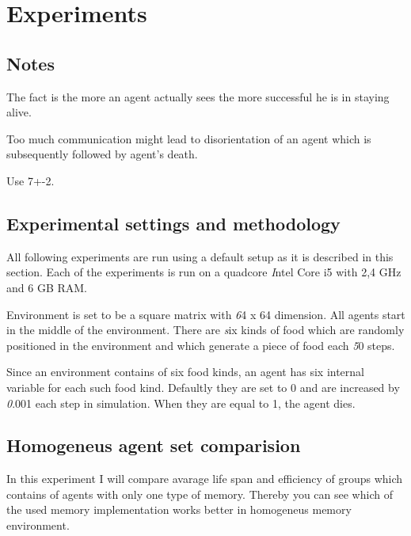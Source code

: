 \chapter{Experiments}

\section{Notes}

The fact is the more an agent actually sees the more successful he is in staying alive.

Too much communication might lead to disorientation of an agent which is subsequently followed by agent's death.

Use 7+-2.

\section{Experimental settings and methodology}

All following experiments are run using a default setup as it is described in this section. Each of the experiments is run on a quadcore {\emph Intel Core i5 with 2,4 GHz and 6 GB RAM}. 

Environment is set to be a square matrix with {\emph 64 x 64 dimension}. All agents start in the middle of the environment. There are {\emph six kinds of food} which are randomly positioned in the environment and which generate a piece of food each {\emph 50 steps}.

Since an environment contains of six food kinds, an agent has six internal variable for each such food kind. Defaultly they are set to 0 and are increased by {\emph 0.001 each step} in simulation. When they are equal to 1, the agent dies.  

\section{Homogeneus agent set comparision}

In this experiment I will compare avarage life span and efficiency of groups which contains of agents with only one type of memory. Thereby you can see which of the used memory implementation works better in homogeneus memory environment.

\section{}